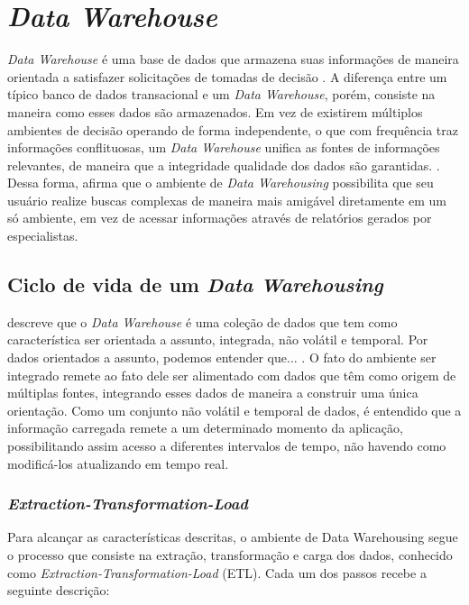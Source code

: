 \chapter{\textit{Data Warehouse}} 
\label{chap:arquitetura}

\textit{Data Warehouse} é uma base de dados que armazena suas informações de maneira orientada a satisfazer solicitações de tomadas de decisão \cite{chaudhuri1997}. A diferença entre um típico banco de dados transacional e um  \textit{Data Warehouse}, porém, consiste na maneira como esses dados são armazenados. Em vez de existirem múltiplos ambientes de decisão operando de forma independente, o que com frequência traz informações conflituosas, um \textit{Data Warehouse} unifica as fontes de informações relevantes, de maneira que a integridade  qualidade dos dados são garantidas. \cite{neeraj_sharma_2011}. Dessa forma, afirma que o ambiente de \textit{Data Warehousing} possibilita que seu usuário realize buscas complexas de maneira mais amigável diretamente em um só ambiente, em vez de acessar informações através de relatórios gerados por especialistas. 

\section{Ciclo de vida de um \textit{Data Warehousing}}

 descreve que o \textit{Data Warehouse} é uma coleção de dados que tem como característica ser orientada a assunto, integrada, não volátil e temporal. Por dados orientados a assunto, podemos entender que... . O fato do ambiente ser integrado remete ao fato dele ser alimentado com dados que têm como origem de múltiplas fontes, integrando esses dados de maneira a construir uma única orientação. Como um conjunto não volátil e temporal de dados, é entendido que a informação carregada remete a um determinado momento da aplicação, possibilitando assim acesso a diferentes intervalos de tempo, não havendo como modificá-los atualizando em tempo real.

\subsection{\textit{Extraction-Transformation-Load}}

 Para alcançar as características descritas, o ambiente de Data Warehousing segue o processo que consiste na extração, transformação e carga dos dados, conhecido como \textit{Extraction-Transformation-Load} (ETL). Cada um dos passos recebe a seguinte descrição:

